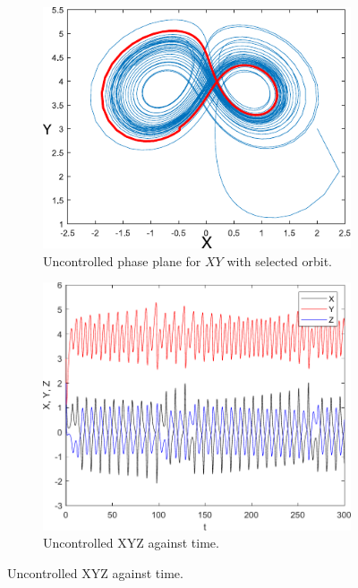 	\begin{figure}[H]
        \centering
        \begin{subfigure}[b]{0.475\textwidth}
            \centering
            \includegraphics[scale=0.75]{files/OrbitXvsYq0_9.pdf}
            \caption{Uncontrolled phase plane for $XY$ with selected orbit.}    
            \label{fig:unctrlXY}
        \end{subfigure}
        \hfill
        \begin{subfigure}[b]{0.475\textwidth}  
            \centering 
            \includegraphics[scale=0.5]{files/OrbitXYZq0_9.pdf}
            \caption{Uncontrolled XYZ against time.}  
            \label{fig:unctrlXYZ}
        \end{subfigure}

\end{figure}

